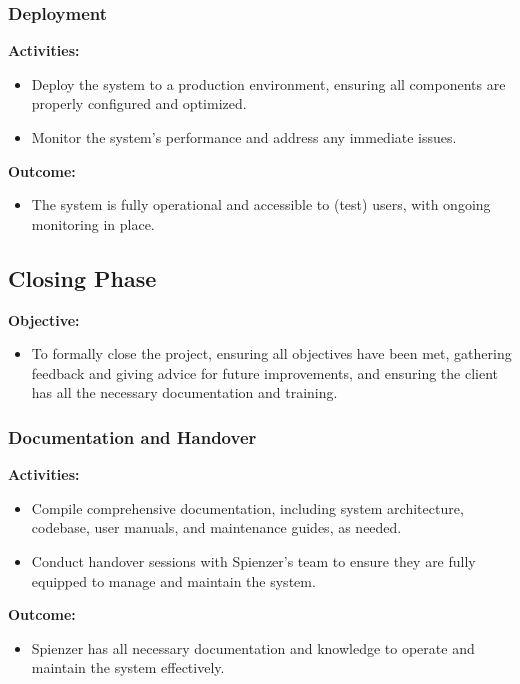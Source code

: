 \documentclass[12pt,a4paper]{article}
\begin{document}
\subsubsection{Deployment}

\noindent \textbf{Activities:}
\begin{itemize}
    \item Deploy the system to a production environment, ensuring all components are properly configured and optimized.
    \item Monitor the system's performance and address any immediate issues.
\end{itemize}

\noindent \textbf{Outcome:}
\begin{itemize}
    \item The system is fully operational and accessible to (test) users, with ongoing monitoring in place.
\end{itemize}

\subsection{Closing Phase}

\noindent \textbf{Objective:}
\begin{itemize}
    \item To formally close the project, ensuring all objectives have been met, gathering feedback and giving advice for future improvements, and ensuring the client has all the necessary documentation and training.
\end{itemize}

\subsubsection{Documentation and Handover}

\noindent \textbf{Activities:}
\begin{itemize}
    \item Compile comprehensive documentation, including system architecture, codebase, user manuals, and maintenance guides, as needed.
    \item Conduct handover sessions with Spienzer's team to ensure they are fully equipped to manage and maintain the system.
\end{itemize}

\noindent \textbf{Outcome:}
\begin{itemize}
    \item Spienzer has all necessary documentation and knowledge to operate and maintain the system effectively.
\end{itemize}
\end{document}
